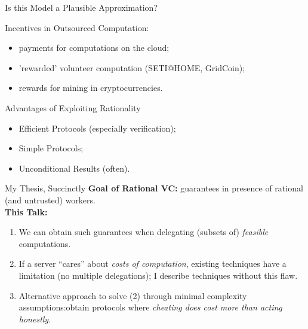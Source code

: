 \begin{frame}{Is this Model a Plausible Approximation?}
\begin{block}{Incentives in Outsourced Computation:}
	\begin{itemize}[<+- | alert@+>]
		\item  payments for computations on the cloud; %
		\item 'rewarded' volunteer computation (SETI@HOME, GridCoin);
		\item  rewards for mining in cryptocurrencies.
	\end{itemize}
\end{block}
\end{frame}

\begin{frame}{Advantages of Exploiting Rationality}

	\begin{itemize}[<+- | alert@+>]
		\item Efficient Protocols (especially verification);
		\item Simple Protocols;
		\item  Unconditional Results (often).
	\end{itemize}

\end{frame}


\begin{frame}[t]{My Thesis, Succinctly}
	\textbf{Goal of Rational VC:} guarantees in presence of rational (and untrusted) workers.\\\vspace{0.9cm} \pause
	\textbf{This Talk:}\\
	\begin{enumerate}
		\item We can obtain such guarantees when delegating (subsets of) \textit{feasible} computations.\pause %
		\item If a server ``cares'' about \textit{costs of computation}, existing techniques have a limitation (no multiple delegations); \pause I describe techniques without this flaw.\pause
		\item Alternative approach to solve (2) through minimal complexity assumptions:\pause obtain protocols where \textit{cheating does cost more than acting honestly}.
	\end{enumerate}
\end{frame}

